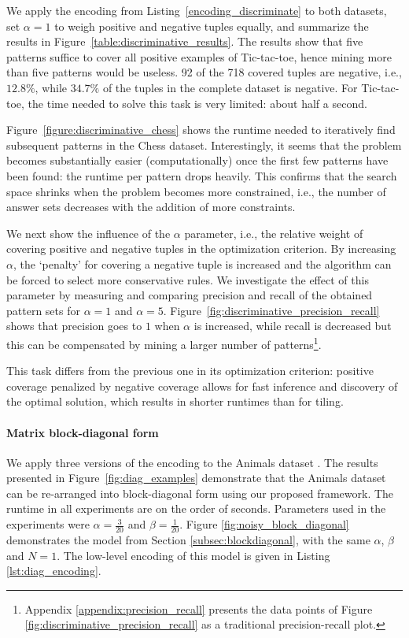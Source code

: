 We apply the encoding from Listing~\ref{encoding_discriminate} to both datasets, set $\alpha = 1$ to weigh positive and negative tuples equally, and summarize the results in Figure~\ref{table:discriminative_results}. The results show that five patterns suffice to cover all positive examples of Tic-tac-toe, hence mining more than five patterns would be useless. 92 of the 718 covered tuples are negative, i.e., $12.8\%$, while $34.7\%$ of the tuples in the complete dataset is negative. For Tic-tac-toe, the time needed to solve this task is very limited: about half a second.

Figure~\ref{figure:discriminative_chess} shows the runtime needed to iteratively find subsequent patterns in the Chess dataset. Interestingly, it seems that the problem becomes substantially easier (computationally) once the first few patterns have been found: the runtime per pattern drops heavily. This confirms that the search space shrinks when the problem becomes more constrained, i.e., the number of answer sets decreases with the addition of more constraints.

We next show the influence of the $\alpha$ parameter, i.e., the relative weight of covering positive and negative tuples in the optimization criterion. By increasing $\alpha$, the `penalty' for covering a negative tuple is increased and the algorithm can be forced to select more conservative rules. We investigate the effect of this parameter by measuring and comparing precision and recall of the obtained pattern sets for $\alpha = 1$ and $\alpha = 5$. Figure~\ref{fig:discriminative_precision_recall} shows that precision goes to $1$ when $\alpha$ is increased, while recall is decreased but this can be compensated by mining a larger number of patterns\footnote{\changesb Appendix \ref{appendix:precision_recall} presents the data points of Figure \ref{fig:discriminative_precision_recall} as a traditional precision-recall plot.\changese}.

This task differs from the previous one in its optimization criterion: positive coverage penalized by negative coverage allows for fast inference and discovery of the optimal solution, which results in shorter runtimes than for tiling. 

\paragraph{Matrix block-diagonal form}

We apply three versions of the encoding to the Animals dataset \parencite{animalDataset}. The results presented in Figure~\ref{fig:diag_examples} demonstrate that the Animals dataset can be re-arranged into block-diagonal form using our proposed framework. The runtime in all experiments are on the order of seconds. Parameters used in the experiments were $\alpha=\frac{3}{20}$ and $\beta=\frac{1}{20}$. Figure \ref{fig:noisy_block_diagonal} demonstrates the model from Section \ref{subsec:blockdiagonal}, with the same $\alpha$, $\beta$ and $N=1$. The low-level encoding of this model is given in Listing \ref{lst:diag_encoding}.

